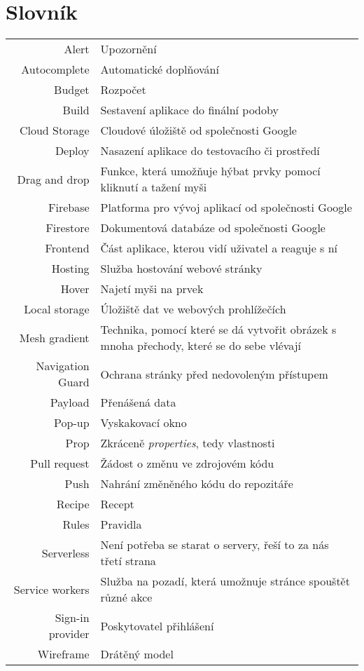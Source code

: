 
\chapter{Slovník}

\begin{tabular}{rp{}}
    Alert               & Upozornění \\
    Autocomplete        & Automatické doplňování \\
    Budget              & Rozpočet \\
    Build               & Sestavení aplikace do finální podoby \\
    Cloud Storage       & Cloudové úložiště od společnosti Google \\
    Deploy              & Nasazení aplikace do testovacího či prostředí \\
    Drag and drop       & Funkce, která umožňuje hýbat prvky pomocí kliknutí a tažení myši \\
    Firebase            & Platforma pro vývoj aplikací od společnosti Google \\
    Firestore           & Dokumentová databáze od společnosti Google \\
    Frontend            & Část aplikace, kterou vidí uživatel a reaguje s ní \\
    Hosting             & Služba hostování webové stránky \\
    Hover               & Najetí myši na prvek \\
    Local storage       & Úložiště dat ve webových prohlížečích \\
    Mesh gradient       & Technika, pomocí které se dá vytvořit obrázek s mnoha přechody, které se do sebe vlévají \\
    Navigation Guard    & Ochrana stránky před nedovoleným přístupem \\
    Payload             & Přenášená data \\
    Pop-up              & Vyskakovací okno \\
    Prop                & Zkráceně \emph{properties}, tedy vlastnosti \\
    Pull request        & Žádost o změnu ve zdrojovém kódu \\
    Push                & Nahrání změněného kódu do repozitáře \\
    Recipe              & Recept \\
    Rules               & Pravidla \\
    Serverless          & Není potřeba se starat o servery, řeší to za nás třetí strana \\
    Service workers     & Služba na pozadí, která umožnuje stránce spouštět různé akce \\
    Sign-in provider    & Poskytovatel přihlášení \\
    Wireframe           & Drátěný model \\
\end{tabular}
